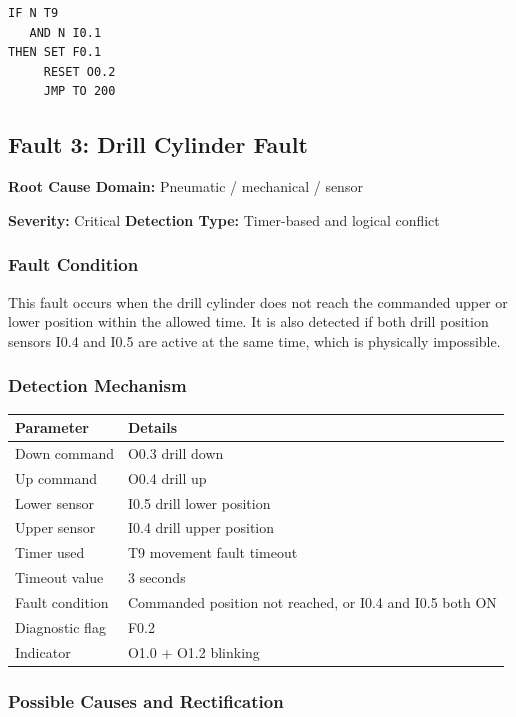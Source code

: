 \begin{verbatim}
IF N T9
   AND N I0.1
THEN SET F0.1
     RESET O0.2
     JMP TO 200
\end{verbatim}

\subsection{Fault 3: Drill Cylinder Fault}

\textbf{Root Cause Domain:} Pneumatic / mechanical / sensor

\textbf{Severity:} Critical \quad \textbf{Detection Type:} Timer-based and logical conflict

\subsubsection{Fault Condition}

This fault occurs when the drill cylinder does not reach the commanded upper or lower position within the allowed time. It is also detected if both drill position sensors I0.4 and I0.5 are active at the same time, which is physically impossible.

\subsubsection{Detection Mechanism}

\begin{longtable}{|p{3.6cm}|p{9.2cm}|}
\hline
Parameter & Details \\
\hline
Down command & O0.3 drill down \\
\hline
Up command & O0.4 drill up \\
\hline
Lower sensor & I0.5 drill lower position \\
\hline
Upper sensor & I0.4 drill upper position \\
\hline
Timer used & T9 movement fault timeout \\
\hline
Timeout value & 3 seconds \\
\hline
Fault condition & Commanded position not reached, or I0.4 and I0.5 both ON \\
\hline
Diagnostic flag & F0.2 \\
\hline
Indicator & O1.0 + O1.2 blinking \\
\hline
\end{longtable}

\subsubsection{Possible Causes and Rectification}

